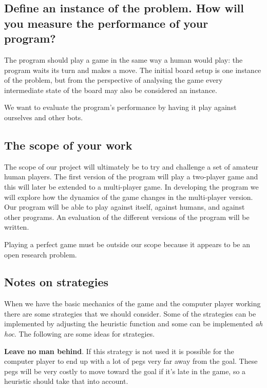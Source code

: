 \documentclass[a4paper,11pt]{article}
\begin{document}
\subsection{Define an instance of the problem. How will you measure the performance of your program?}%

The program should play a game in the same way a human would play: the
program waits its turn and makes a move. The initial board setup is
one instance of the problem, but from the perspective of analysing the
game every intermediate state of the board may also be considered an
instance.

We want to evaluate the program's performance by having it play
against ourselves and other bots.


\subsection{The scope of your work}%

The scope of our project will ultimately be to try and challenge a set
of amateur human players. The first version of the program will play a
two-player game and this will later be extended to a multi-player
game. In developing the program we will explore how the dynamics of
the game changes in the multi-player version. Our program will be able
to play against itself, against humans, and against other programs. An
evaluation of the different versions of the program will be written.

Playing a perfect game must be outside our scope because it appears to
be an open research problem.

\subsection{Notes on strategies}%

When we have the basic mechanics of the game and the computer player
working there are some strategies that we should consider. Some of the
strategies can be implemented by adjusting the heuristic function and
some can be implemented \emph{ah hoc}. The following are some ideas
for strategies.

\textbf{Leave no man behind}. If this strategy is not used it is
possible for the computer player to end up with a lot of pegs very far
away from the goal. These pegs will be very costly to move toward the
goal if it's late in the game, so a heuristic should take that into
account.
\end{document}
